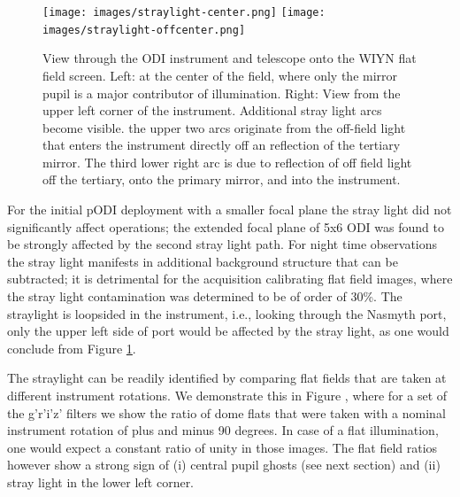 \documentclass[]{spieman}
\begin{document}
\begin{figure}[]
	\centering
	\texttt{[image: images/straylight-center.png]}
	\texttt{[image: images/straylight-offcenter.png]}
	\caption{\label{fig_straylight} View through the ODI instrument and 
	telescope
	onto the WIYN flat field screen. Left: at the center of the field, where 
	only
	the mirror pupil is a major contributor of illumination. Right: View from 
	the
	upper left corner of the instrument. Additional stray light arcs become
	visible. the upper two arcs originate from the off-field light that enters 
	the
	instrument directly off an reflection of the tertiary mirror. The third 
	lower
	right arc is due to reflection of off field light off the tertiary, onto the
	primary mirror, and  into the instrument. }
\end{figure}


For the initial pODI deployment with a smaller focal plane the stray
light did not significantly affect operations; the extended focal plane of
5x6 ODI was found to be strongly affected by the second stray light path.
For night time observations the stray light manifests in additional
background structure that can be subtracted; it is detrimental for the acquisition 
calibrating flat field images, where the stray light contamination was determined to
be of order of 30\%. The straylight is loopsided in the instrument, i.e., looking through the
Nasmyth port, only the upper left side of port would be affected by the
stray light, as one would conclude from Figure \ref{fig_straylight}.

The straylight  can be readily identified by comparing flat fields that are 
taken at different instrument rotations. We demonstrate this in Figure \label{fig_flatfieldbaffle},
 where for a set of the g'r'i'z' filters we show the ratio of dome flats that 
 were taken with a nominal instrument rotation of plus and minus 90 degrees.  In
 case of a flat illumination, one would expect a constant ratio of unity in those images. 
  The flat field ratios however show a strong sign of (i) central pupil ghosts (see next section) and (ii) stray light in the 
 lower left corner.

 
\end{document}
